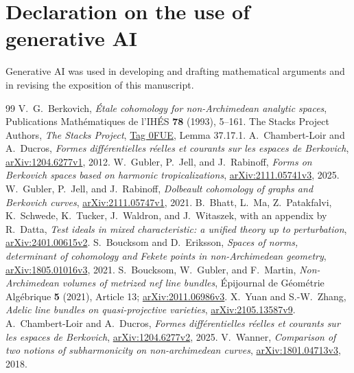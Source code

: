 \documentclass[11pt]{amsart}
\theoremstyle{definition}
\theoremstyle{remark}
\numberwithin{equation}{section}
\begin{document}
\section*{Declaration on the use of generative AI}
Generative AI was used in developing and drafting mathematical
arguments and in revising the exposition of this manuscript.

\begin{thebibliography}{99}
V.~G.~Berkovich,
\emph{\'Etale cohomology for non-Archimedean analytic spaces},
Publications Math\'ematiques de l'IH\'ES \textbf{78} (1993), 5--161.
The Stacks Project Authors,
\emph{The Stacks Project},
\href{https://stacks.math.columbia.edu/tag/0FUE}{Tag 0FUE},
Lemma 37.17.1.
A.~Chambert-Loir and A.~Ducros,
\emph{Formes diff\'erentielles r\'eelles et courants sur les espaces
de Berkovich}, \href{https://arxiv.org/abs/1204.6277v1}{arXiv:1204.6277v1},
2012.
W.~Gubler, P.~Jell, and J.~Rabinoff,
\emph{Forms on Berkovich spaces based on harmonic tropicalizations},
\href{https://arxiv.org/abs/2111.05741v3}{arXiv:2111.05741v3}, 2025.
W.~Gubler, P.~Jell, and J.~Rabinoff,
\emph{Dolbeault cohomology of graphs and Berkovich curves},
\href{https://arxiv.org/abs/2111.05747v1}{arXiv:2111.05747v1}, 2021.
B.~Bhatt, L.~Ma, Z.~Patakfalvi, K.~Schwede, K.~Tucker, J.~Waldron,
and J.~Witaszek, with an appendix by R.~Datta,
\emph{Test ideals in mixed characteristic: a unified theory up to
perturbation},
\href{https://arxiv.org/abs/2401.00615v2}{arXiv:2401.00615v2}.
S.~Boucksom and D.~Eriksson,
\emph{Spaces of norms, determinant of cohomology and Fekete points
in non-Archimedean geometry},
\href{https://arxiv.org/abs/1805.01016v3}{arXiv:1805.01016v3}, 2021.
S.~Boucksom, W.~Gubler, and F.~Martin,
\emph{Non-Archimedean volumes of metrized nef line bundles},
\'Epijournal de G\'eom\'etrie Alg\'ebrique \textbf{5} (2021),
Article 13;
\href{https://arxiv.org/abs/2011.06986v3}{arXiv:2011.06986v3}.
X.~Yuan and S.-W.~Zhang,
\emph{Adelic line bundles on quasi-projective varieties},
\href{https://arxiv.org/abs/2105.13587v9}{arXiv:2105.13587v9}.
A.~Chambert-Loir and A.~Ducros,
\emph{Formes diff\'erentielles r\'eelles et courants sur les espaces
de Berkovich},
\href{https://arxiv.org/abs/1204.6277v2}{arXiv:1204.6277v2}, 2025.
V.~Wanner,
\emph{Comparison of two notions of subharmonicity on non-archimedean
curves},
\href{https://arxiv.org/abs/1801.04713v3}{arXiv:1801.04713v3}, 2018.

\end{thebibliography}
\end{document}

